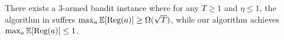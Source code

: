 \begin{theorem}\label{thm:lower bound}
There exists a $3$-armed bandit instance where for any $T\geq 1$ and $\eta \le 1$, the algorithm in \cite{foster2024model} suffers $\max_a \mathbb{E}[\text{\rm Reg}(a)] \ge \Omega(\sqrt{T})$, while our algorithm achieves $\max_a \mathbb{E}[\text{\rm Reg}(a)] \leq 1$. 
\end{theorem}

